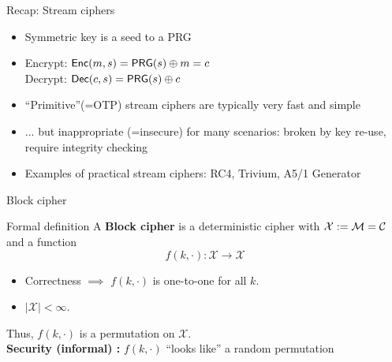 \documentclass[usenames,dvipsnames, 9pt]{beamer}
\begin{document}
\begin{frame}{Recap: Stream ciphers}
	\LARGE 
	
	\begin{itemize}
		\itemsep1em
		\item Symmetric key is a seed to a PRG
		\item Encrypt:  $\textsf{Enc}(m, s) = \mathsf{PRG}(s) \oplus m = c$ \\
				 Decrypt: $\textsf{Dec}(c, s) = \mathsf{PRG}(s) \oplus c$
		\item ``Primitive''(=OTP) stream ciphers  are typically very fast and simple
		\item ... but inappropriate (=insecure) for many scenarios: broken by key re-use, require integrity checking
		\item Examples of practical stream ciphers: RC4, Trivium, A5/1 Generator
	\end{itemize}
\end{frame}

\begin{frame}{Block cipher}
\LARGE
	\begin{block}{Formal definition}
		A {\color{Orange}\textbf{Block cipher}} is a deterministic cipher with $\mathcal{X}:=\mathcal{M} = \mathcal{C}$ and a function
		\[
			f(k, \cdot): \mathcal{X} \rightarrow \mathcal{X}
		\]
	\end{block}
\begin{itemize}
	\item Correctness $\implies$ $f(k, \cdot)$ is one-to-one for all $k$. \\
	\item $|\mathcal{X}| < \infty$. \\
\end{itemize}

Thus, $f(k, \cdot)$ is a permutation on $\mathcal{X}$. \\[10pt]

{\color{Orange}\textbf{Security (informal) :}} $f(k, \cdot)$ ``looks like'' a random permutation 
\end{frame}
\end{document}
